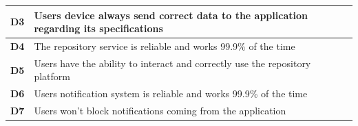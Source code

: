 \documentclass[../RASD.tex]{subfiles}
\begin{document}
\begin{table}[ht]
\begin{center}
\begin{tabular}{|m{2em}|m{30em}|}
                \hline
                \cellcolor{ReqMappingCell3}
                \textbf{D3} & Users device always send correct data to the application regarding its specifications\\
                \hline
                \cellcolor{ReqMappingCell3}
                \textbf{D4} & The repository service is reliable and works 99.9\% of the time\\
                \hline
                \cellcolor{ReqMappingCell3}
                \textbf{D5} & Users have the ability to interact and correctly use the repository platform\\
                \hline
                \cellcolor{ReqMappingCell3}
                \textbf{D6} & Users notification system is reliable and works 99.9\% of the time\\
                \hline
                \cellcolor{ReqMappingCell3}
                \textbf{D7} & Users won't block notifications coming from the application\\
                \hline
                \end{tabular}
            \end{center}
        \end{table}\newpage
\end{document}
